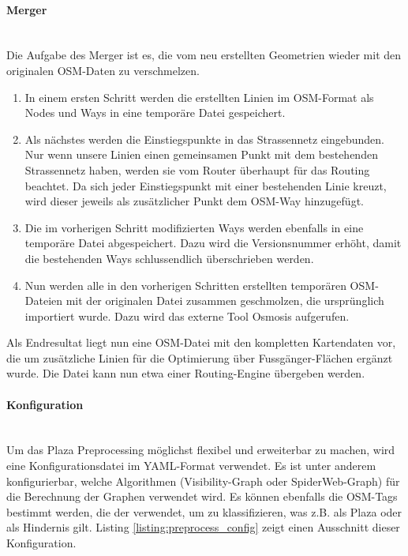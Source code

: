 \paragraph{Merger}\label{impl:Merger}~\\
Die Aufgabe des Merger ist es, die vom  neu erstellten Geometrien wieder mit den originalen \ac{OSM}-Daten zu verschmelzen.
\begin{enumerate}
    \item In einem ersten Schritt werden die erstellten Linien im \ac{OSM}-Format als Nodes und Ways in eine temporäre Datei gespeichert.
    \item Als nächstes werden die Einstiegspunkte in das Strassennetz eingebunden. Nur wenn unsere Linien einen gemeinsamen Punkt mit dem bestehenden Strassennetz haben, werden sie vom Router überhaupt für das Routing beachtet. Da sich jeder Einstiegspunkt mit einer bestehenden Linie kreuzt, wird dieser jeweils als zusätzlicher Punkt dem \ac{OSM}-Way hinzugefügt.
    \item Die im vorherigen Schritt modifizierten Ways werden ebenfalls in eine temporäre Datei abgespeichert. Dazu wird die Versionsnummer erhöht, damit die bestehenden Ways schlussendlich überschrieben werden.
    \item Nun werden alle in den vorherigen Schritten erstellten temporären \ac{OSM}-Dateien mit der originalen Datei zusammen geschmolzen, die ursprünglich importiert wurde. Dazu wird das externe Tool Osmosis \cite{osmosis} aufgerufen.
\end{enumerate}

Als Endresultat liegt nun eine \ac{OSM}-Datei mit den kompletten Kartendaten vor, die um zusätzliche Linien für die Optimierung über Fussgänger-Flächen ergänzt wurde. Die Datei kann nun etwa einer Routing-Engine übergeben werden.

\paragraph{Konfiguration}\label{impl:preprocess_konfiguration}~\\
Um das Plaza Preprocessing möglichst flexibel und erweiterbar zu machen, wird eine Konfigurationsdatei im YAML-Format verwendet. Es ist unter anderem konfigurierbar, welche Algorithmen (Visibility-Graph oder SpiderWeb-Graph) für die Berechnung der Graphen verwendet wird. Es können ebenfalls die \ac{OSM}-Tags bestimmt werden, die der  verwendet, um zu klassifizieren, was z.B. als Plaza oder als Hindernis gilt. Listing \ref{listing:preprocess_config} zeigt einen Ausschnitt dieser Konfiguration.

